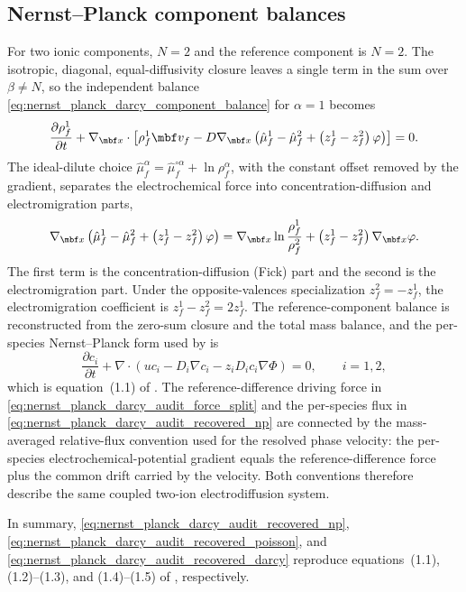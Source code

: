 \subsection{Nernst--Planck component balances}

For two ionic components, \(N=2\) and the reference component is \(N=2\).
The isotropic, diagonal, equal-diffusivity closure leaves a single term in
the sum over \(\beta\ne N\), so the independent balance
\eqref{eq:nernst_planck_darcy_component_balance} for \(\alpha=1\) becomes
%
\begin{equation}
	\frac{\partial\rho_f^1}{\partial t}
	+
	\nabla_{\mbf x}\cdot
	\left[
		\rho_f^1\mbf v_f
		-
		D\nabla_{\mbf x}
		\left(
			\hat\mu_f^1-\hat\mu_f^2
			+
			\left(z_f^1-z_f^2\right)\varphi
		\right)
	\right]
	=0 .
	\label{eq:nernst_planck_darcy_audit_two_ion_balance}
\end{equation}
%
The ideal-dilute choice
\(\hat\mu_f^\alpha=\hat\mu_f^{\circ\alpha}+\ln\rho_f^\alpha\), with the
constant offset removed by the gradient, separates the electrochemical force
into concentration-diffusion and electromigration parts,
%
\begin{equation}
	\nabla_{\mbf x}
	\left(
		\hat\mu_f^1-\hat\mu_f^2
		+
		\left(z_f^1-z_f^2\right)\varphi
	\right)
	=
	\nabla_{\mbf x}\ln\frac{\rho_f^1}{\rho_f^2}
	+
	\left(z_f^1-z_f^2\right)\nabla_{\mbf x}\varphi .
	\label{eq:nernst_planck_darcy_audit_force_split}
\end{equation}
%
The first term is the concentration-diffusion (Fick) part and the second is
the electromigration part.  Under the opposite-valences specialization
\(z_f^2=-z_f^1\), the electromigration coefficient is
\(z_f^1-z_f^2=2z_f^1\).  The reference-component balance is reconstructed
from the zero-sum closure and the total mass balance, and the per-species
Nernst--Planck form used by \cite{ignatova2021charged_fluids} is
%
\begin{equation}
	\frac{\partial c_i}{\partial t}
	+
	\nabla\cdot
	\left(
		u c_i-D_i\nabla c_i-z_iD_i c_i\nabla\Phi
	\right)
	=0,
	\qquad
	i=1,2,
	\label{eq:nernst_planck_darcy_audit_recovered_np}
\end{equation}
%
which is equation~(1.1) of \cite{ignatova2021charged_fluids}.  The
reference-difference driving force in
\eqref{eq:nernst_planck_darcy_audit_force_split} and the per-species flux in
\eqref{eq:nernst_planck_darcy_audit_recovered_np} are connected by the
mass-averaged relative-flux convention used for the resolved phase velocity:
the per-species electrochemical-potential gradient equals the
reference-difference force plus the common drift carried by the velocity.
Both conventions therefore describe the same coupled two-ion
electrodiffusion system.

In summary, \eqref{eq:nernst_planck_darcy_audit_recovered_np},
\eqref{eq:nernst_planck_darcy_audit_recovered_poisson}, and
\eqref{eq:nernst_planck_darcy_audit_recovered_darcy} reproduce
equations~(1.1), (1.2)--(1.3), and (1.4)--(1.5) of
\cite{ignatova2021charged_fluids}, respectively.
